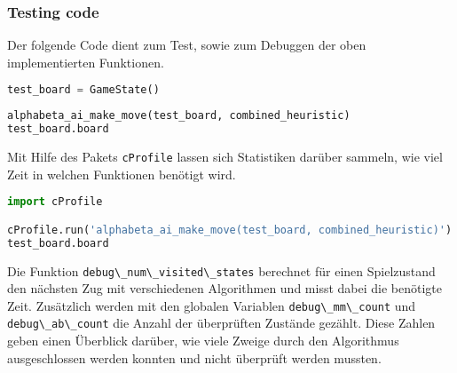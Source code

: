 \hypertarget{testing-code}{%
\subsubsection{Testing code}\label{testing-code}}

Der folgende Code dient zum Test, sowie zum Debuggen der oben
implementierten Funktionen.

\begin{lstlisting}[language=Python]
test_board = GameState()
\end{lstlisting}

\begin{lstlisting}[language=Python]
alphabeta_ai_make_move(test_board, combined_heuristic)
test_board.board
\end{lstlisting}

Mit Hilfe des Pakets \passthrough{\lstinline!cProfile!} lassen sich
Statistiken darüber sammeln, wie viel Zeit in welchen Funktionen
benötigt wird.

\begin{lstlisting}[language=Python]
import cProfile

cProfile.run('alphabeta_ai_make_move(test_board, combined_heuristic)')
test_board.board
\end{lstlisting}

Die Funktion \passthrough{\lstinline!debug\_num\_visited\_states!}
berechnet für einen Spielzustand den nächsten Zug mit verschiedenen
Algorithmen und misst dabei die benötigte Zeit. Zusätzlich werden mit
den globalen Variablen \passthrough{\lstinline!debug\_mm\_count!} und
\passthrough{\lstinline!debug\_ab\_count!} die Anzahl der überprüften
Zustände gezählt. Diese Zahlen geben einen Überblick darüber, wie viele
Zweige durch den Algorithmus ausgeschlossen werden konnten und nicht
überprüft werden mussten.

